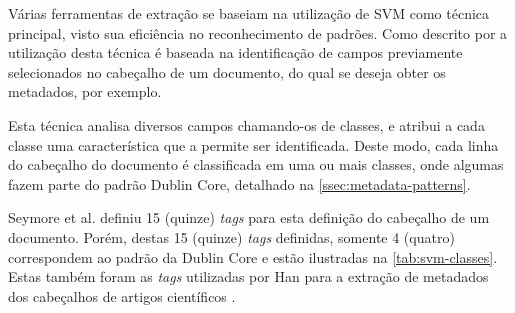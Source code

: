 \begin{textedited}
Várias ferramentas de extração se baseiam na utilização de SVM como técnica principal, visto sua eficiência no reconhecimento de padrões. Como descrito por \cite{Han-SVM} a utilização desta técnica é baseada na identificação de campos previamente selecionados no cabeçalho de um documento, do qual se deseja obter os metadados, por exemplo.

Esta técnica analisa diversos campos chamando-os de classes, e atribui a cada classe uma característica que a permite ser identificada. Deste modo, cada linha do cabeçalho do documento é classificada em uma ou mais classes, onde algumas fazem parte do padrão Dublin Core, detalhado na \autoref{ssec:metadata-patterns}.

Seymore et al. \cite{Seymore-HMM-IE} definiu 15 (quinze) \textit{tags} para esta definição do cabeçalho de um documento. Porém, destas 15 (quinze) \textit{tags} definidas, somente 4 (quatro) correspondem ao padrão da Dublin Core e estão ilustradas na \autoref{tab:svm-classes}. Estas também foram as \textit{tags} utilizadas por Han para a extração de metadados dos cabeçalhos de artigos científicos \cite{Han-SVM}.

\end{textedited}



